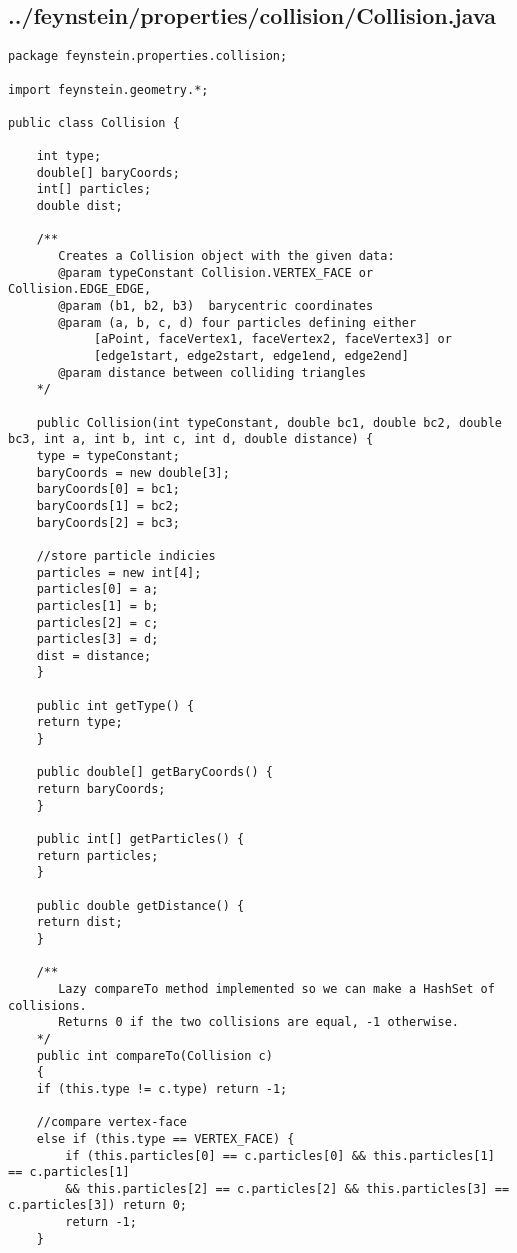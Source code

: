 \subsection*{../feynstein/properties/collision/Collision.java}
\begin{lstlisting}
package feynstein.properties.collision;

import feynstein.geometry.*;

public class Collision {

    int type;
    double[] baryCoords;
    int[] particles;
    double dist;

    /**
       Creates a Collision object with the given data:
       @param typeConstant Collision.VERTEX_FACE or Collision.EDGE_EDGE,
       @param (b1, b2, b3)  barycentric coordinates
       @param (a, b, c, d) four particles defining either 
            [aPoint, faceVertex1, faceVertex2, faceVertex3] or
            [edge1start, edge2start, edge1end, edge2end]
       @param distance between colliding triangles
    */
       
    public Collision(int typeConstant, double bc1, double bc2, double bc3, int a, int b, int c, int d, double distance) {
	type = typeConstant;
	baryCoords = new double[3];
	baryCoords[0] = bc1;
	baryCoords[1] = bc2;
	baryCoords[2] = bc3;

	//store particle indicies
	particles = new int[4];
	particles[0] = a;
	particles[1] = b;
	particles[2] = c;
	particles[3] = d;
	dist = distance;
    }

    public int getType() {
	return type;
    }

    public double[] getBaryCoords() {
	return baryCoords;
    }

    public int[] getParticles() {
	return particles;
    }

    public double getDistance() {
	return dist;
    }

    /**
       Lazy compareTo method implemented so we can make a HashSet of collisions. 
       Returns 0 if the two collisions are equal, -1 otherwise.
    */
    public int compareTo(Collision c)
    {
	if (this.type != c.type) return -1;

	//compare vertex-face
	else if (this.type == VERTEX_FACE) {
	    if (this.particles[0] == c.particles[0] && this.particles[1] == c.particles[1]
		&& this.particles[2] == c.particles[2] && this.particles[3] == c.particles[3]) return 0;
	    return -1;
	}


\end{lstlisting}
